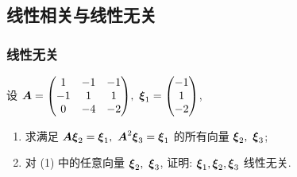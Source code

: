 \subsection{线性相关与线性无关}

\subsubsection{线性无关}

\begin{example}[2009 数一]
    设 $\vb*{A}=\mqty(1&-1&-1\\-1&1&1\\0&-4&-2),~\vb*{\xi}_1=\mqty(-1\\1\\-2)$,
    \begin{enumerate}[label=(\arabic{*})]
        \item 求满足 $\vb*{A\xi}_2=\vb*{\xi}_1,~\vb*{A}^2\vb*{\xi}_3=\vb*{\xi}_1$ 的所有向量 $\vb*{\xi}_2,~\vb*{\xi}_3$;
        \item 对 (1) 中的任意向量 $\vb*{\xi}_2,~\vb*{\xi}_3$, 证明: $\vb*{\xi}_1,\vb*{\xi}_2,\vb*{\xi}_3$ 线性无关.
    \end{enumerate}
\end{example}
